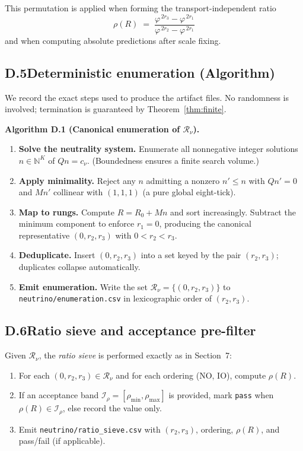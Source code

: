 \documentclass[11pt]{article}
\begin{document}
This permutation is applied when forming the transport-independent ratio
\[
\rho(R)\;=\;\frac{\varphi^{\,2r_3}-\varphi^{\,2r_1}}{\varphi^{\,2r_2}-\varphi^{\,2r_1}}
\]
and when computing absolute predictions after scale fixing.

\subsection*{D.5\quad Deterministic enumeration (Algorithm)}

We record the exact steps used to produce the artifact files. No randomness is involved; termination is guaranteed by Theorem~\ref{thm:finite}.

\medskip
\noindent\textbf{Algorithm D.1 (Canonical enumeration of $\mathcal{R}_\nu$).}
\begin{enumerate}
  \item \textbf{Solve the neutrality system.} Enumerate all nonnegative integer solutions $n\in\mathbb{N}^K$ of $Qn=c_\nu$. (Boundedness ensures a finite search volume.)
  \item \textbf{Apply minimality.} Reject any $n$ admitting a nonzero $n'\le n$ with $Qn'=0$ and $Mn'$ collinear with $(1,1,1)$ (a pure global eight-tick).
  \item \textbf{Map to rungs.} Compute $R=R_0+Mn$ and sort increasingly. Subtract the minimum component to enforce $r_1=0$, producing the canonical representative $(0,r_2,r_3)$ with $0<r_2<r_3$.
  \item \textbf{Deduplicate.} Insert $(0,r_2,r_3)$ into a set keyed by the pair $(r_2,r_3)$; duplicates collapse automatically.
  \item \textbf{Emit enumeration.} Write the set $\mathcal{R}_\nu=\{(0,r_2,r_3)\}$ to \texttt{neutrino/enumeration.csv} in lexicographic order of $(r_2,r_3)$.
\end{enumerate}

\subsection*{D.6\quad Ratio sieve and acceptance pre-filter}

Given $\mathcal{R}_\nu$, the \emph{ratio sieve} is performed exactly as in Section~7:

\begin{enumerate}
  \item For each $(0,r_2,r_3)\in\mathcal{R}_\nu$ and for each ordering (NO, IO), compute $\rho(R)$.
  \item If an acceptance band $\mathcal{I}_\rho=[\rho_{\min},\rho_{\max}]$ is provided, mark \texttt{pass} when $\rho(R)\in\mathcal{I}_\rho$, else record the value only.
  \item Emit \texttt{neutrino/ratio\_sieve.csv} with $(r_2,r_3)$, ordering, $\rho(R)$, and pass/fail (if applicable).
\end{enumerate}
\end{document}
